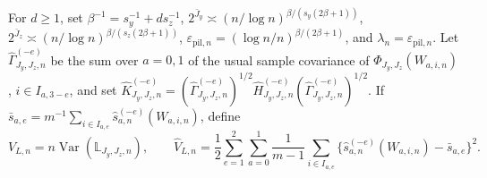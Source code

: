 For \(d\ge1\), set \(\beta^{-1}=s_y^{-1}+ds_z^{-1}\), \(2^{\bar J_y}\asymp(n/\log n)^{\beta/(s_y(2\beta+1))}\), \(2^{\bar J_z}\asymp(n/\log n)^{\beta/(s_z(2\beta+1))}\), \(\varepsilon_{\mathrm{pil},n}=(\log n/n)^{\beta/(2\beta+1)}\), and \(\lambda_n=\varepsilon_{\mathrm{pil},n}\). Let \(\widehat\Gamma_{J_y,J_z,n}^{(-e)}\) be the sum over \(a=0,1\) of the usual sample covariance of \(\Phi_{J_y,J_z}(W_{a,i,n})\), \(i\in I_{a,3-e}\), and set \(\widehat K_{J_y,J_z,n}^{(-e)}=(\widehat\Gamma_{J_y,J_z,n}^{(-e)})^{1/2}\widehat H_{J_y,J_z,n}^{(-e)}(\widehat\Gamma_{J_y,J_z,n}^{(-e)})^{1/2}\). If \(\bar s_{a,e}=m^{-1}\sum_{i\in I_{a,e}}\widehat s_{a,n}^{(-e)}(W_{a,i,n})\), define \[V_{L,n}=n\operatorname{Var}(\mathbb L_{J_y,J_z,n}),\qquad \widehat V_{L,n}=\frac12\sum_{e=1}^2\sum_{a=0}^1\frac{1}{m-1}\sum_{i\in I_{a,e}}\{\widehat s_{a,n}^{(-e)}(W_{a,i,n})-\bar s_{a,e}\}^2.\]